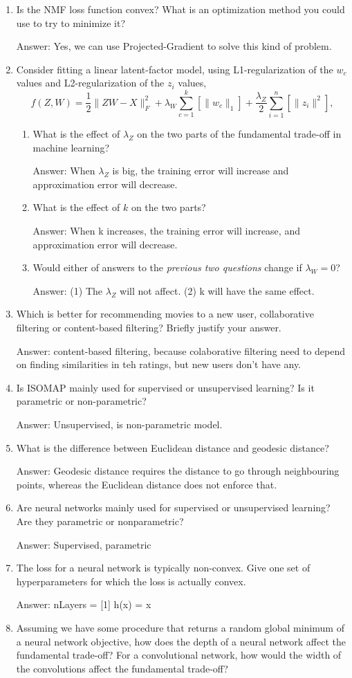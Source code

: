 \documentclass{article}
\def\ans#1{\par\gre{Answer: #1}}
\def\blu#1{{\color{blu}#1}}
\def\gre#1{{\color{gre}#1}}
\def\norm#1{\|#1\|}
\def\enum#1{\begin{enumerate}#1\end{enumerate}}
\begin{document}
\blu{
\enum{
\item Is the NMF loss function convex? What is an optimization method you could use to try to minimize it? \ans{Yes, we can use Projected-Gradient to solve this kind of problem.}
\item Consider fitting a linear latent-factor model, using L1-regularization of the $w_c$ values and L2-regularization of the $z_i$ values,
\[
f(Z,W) = \frac{1}{2}\norm{ZW - X}_F^2 + \lambda_W \sum_{c=1}^k \left[\norm{w_c}_1\right] + \frac{\lambda_Z}{2} \sum_{i=1}^n \left[\norm{z_i}^2\right],
\]
\enum{
\item What is the effect of $\lambda_Z$ on the two parts of the fundamental trade-off in machine learning? \ans{When $\lambda _Z$ is big, the training error will increase and approximation error will decrease.}
\item What is the effect of $k$ on the two parts? \ans{When k increases, the training error will increase, and approximation error will decrease.}
\item Would either of answers to the \emph{previous two questions} change if $\lambda_W = 0$? \ans{(1) The $\lambda_Z$ will not affect. (2) k will have the same effect.}
}
\item Which is better for recommending movies to a new user, collaborative filtering or content-based filtering? Briefly justify your answer.
\ans{content-based filtering, because colaborative filtering need to depend on finding similarities in teh ratings, but new users don't have any.}
\item Is ISOMAP mainly used for supervised or unsupervised learning? Is it parametric or non-parametric?
\ans{Unsupervised, is non-parametric model.}
\item What is the difference between Euclidean distance and geodesic distance?
\ans{Geodesic distance requires the distance to go through neighbouring points, whereas the Euclidean distance does not enforce that.}
\item Are neural networks mainly used for supervised or unsupervised learning? Are they parametric or nonparametric?
\ans{Supervised, parametric}
\item The loss for a neural network is typically non-convex. Give one set of hyperparameters for which the loss is actually convex.
\ans{nLayers = [1] h(x) = x}
\item Assuming we have some procedure that returns a random global minimum of a neural network objective, how does the depth of a neural network affect the fundamental trade-off? For a convolutional network, how would the width of the convolutions affect the fundamental trade-off?
}}
\end{document}
